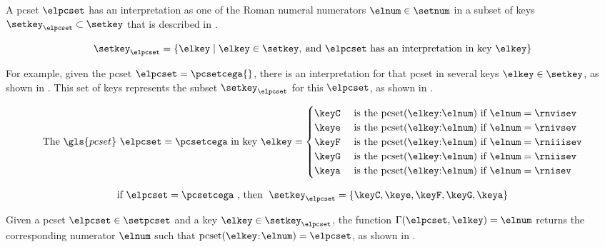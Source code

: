 
A \gls{pcset} $\elpcset$ has an interpretation as one of the
Roman numeral numerators $\elnum \in \setnum$ in a subset of
keys $\setkey_{\elpcset} \subset \setkey$ that is described
in .

\begin{equation}
    \label{eq:keys_for_pcset}
    \setkey_{\elpcset} = \{\elkey \mid \elkey \in \setkey,
     \: \text{and $\elpcset$ has an interpretation in key $\elkey$}\}
\end{equation}

For example, given the \gls{pcset} $\elpcset =
\pcsetcega{}$, there is an interpretation for that
\gls{pcset} in several keys $\elkey \in \setkey$, as shown
in . This set of keys represents the
subset $\setkey_\elpcset$ for this $\elpcset$, as shown in
. 

\begin{equation}
    \label{eq:pcset_cega}
    \text{The } \gls{pcset} \text{ } \elpcset = \pcsetcega \text{ in key } \elkey =
    \begin{cases}
        \keyC & \text{ is the pcset}(\elkey\text{:}\elnum)\text{ if } \elnum = \rnvisev \\
        \keye & \text{ is the pcset}(\elkey\text{:}\elnum)\text{ if } \elnum = \rnivsev \\
        \keyF & \text{ is the pcset}(\elkey\text{:}\elnum)\text{ if } \elnum = \rniiisev \\
        \keyG & \text{ is the pcset}(\elkey\text{:}\elnum)\text{ if } \elnum = \rniisev \\
        \keya & \text{ is the pcset}(\elkey\text{:}\elnum)\text{ if } \elnum = \rnisev \\
    \end{cases}
\end{equation}

\begin{equation}
    \label{eq:keys_for_pcset_example}
    \text{if } \elpcset = \pcsetcega \text{ , then } \; 
    \setkey_{\elpcset} = \{ \keyC, \keye, \keyF, \keyG, \keya \}
\end{equation}

Given a \gls{pcset} $\elpcset \in \setpcset$ and a key
$\elkey \in \setkey_\elpcset$, the function
$\Gamma(\elpcset, \elkey) = \elnum$ returns the
corresponding numerator $\elnum$ such that
$\text{pcset}(\elkey$:$\elnum) = \elpcset$, as shown in
.

